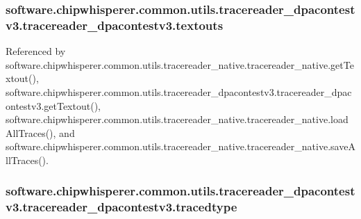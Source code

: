 \subsubsection[{textouts}]{\setlength{\rightskip}{0pt plus 5cm}software.\+chipwhisperer.\+common.\+utils.\+tracereader\+\_\+dpacontestv3.\+tracereader\+\_\+dpacontestv3.\+textouts}\label{classsoftware_1_1chipwhisperer_1_1common_1_1utils_1_1tracereader__dpacontestv3_1_1tracereader__dpacontestv3_a5e506bd057a1a0e4803144f6e6495c21}


Referenced by software.\+chipwhisperer.\+common.\+utils.\+tracereader\+\_\+native.\+tracereader\+\_\+native.\+get\+Textout(), software.\+chipwhisperer.\+common.\+utils.\+tracereader\+\_\+dpacontestv3.\+tracereader\+\_\+dpacontestv3.\+get\+Textout(), software.\+chipwhisperer.\+common.\+utils.\+tracereader\+\_\+native.\+tracereader\+\_\+native.\+load\+All\+Traces(), and software.\+chipwhisperer.\+common.\+utils.\+tracereader\+\_\+native.\+tracereader\+\_\+native.\+save\+All\+Traces().

\hypertarget{classsoftware_1_1chipwhisperer_1_1common_1_1utils_1_1tracereader__dpacontestv3_1_1tracereader__dpacontestv3_a4e7a0289079d365b1878d16da941a1d9}{}
\subsubsection[{tracedtype}]{\setlength{\rightskip}{0pt plus 5cm}software.\+chipwhisperer.\+common.\+utils.\+tracereader\+\_\+dpacontestv3.\+tracereader\+\_\+dpacontestv3.\+tracedtype}\label{classsoftware_1_1chipwhisperer_1_1common_1_1utils_1_1tracereader__dpacontestv3_1_1tracereader__dpacontestv3_a4e7a0289079d365b1878d16da941a1d9}
\hypertarget{classsoftware_1_1chipwhisperer_1_1common_1_1utils_1_1tracereader__dpacontestv3_1_1tracereader__dpacontestv3_a2e0902fde663a330f61c4240aa4d4975}{}
